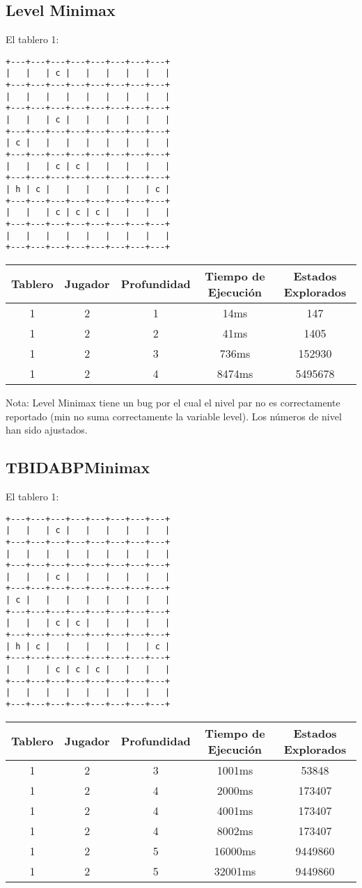 \documentclass[10pt,a4paper,notitlepage]{article}
\begin{document}
\newpage
\subsection{Level Minimax}

El tablero 1:
\begin{verbatim}
+---+---+---+---+---+---+---+---+
|   |   | c |   |   |   |   |   |
+---+---+---+---+---+---+---+---+
|   |   |   |   |   |   |   |   |
+---+---+---+---+---+---+---+---+
|   |   | c |   |   |   |   |   |
+---+---+---+---+---+---+---+---+
| c |   |   |   |   |   |   |   |
+---+---+---+---+---+---+---+---+
|   |   | c | c |   |   |   |   |
+---+---+---+---+---+---+---+---+
| h | c |   |   |   |   |   | c |
+---+---+---+---+---+---+---+---+
|   |   | c | c | c |   |   |   |
+---+---+---+---+---+---+---+---+
|   |   |   |   |   |   |   |   |
+---+---+---+---+---+---+---+---+
\end{verbatim}
\begin{tabular}{|c|c|c|c|c|}
\hline
Tablero & Jugador & Profundidad & Tiempo de Ejecución & Estados Explorados \\
\hline
\hline
1&2&1&14ms&147\\
\hline
1&2&2&41ms&1405\\
\hline
1&2&3&736ms&152930\\
\hline
1&2&4&8474ms&5495678\\
\hline
\end{tabular}

Nota: Level Minimax tiene un bug por el cual el nivel par no es correctamente reportado (min no suma correctamente la variable level). Los números de nivel han sido ajustados.

\newpage
\subsection{TBIDABPMinimax}
El tablero 1:
\begin{verbatim}
+---+---+---+---+---+---+---+---+
|   |   | c |   |   |   |   |   |
+---+---+---+---+---+---+---+---+
|   |   |   |   |   |   |   |   |
+---+---+---+---+---+---+---+---+
|   |   | c |   |   |   |   |   |
+---+---+---+---+---+---+---+---+
| c |   |   |   |   |   |   |   |
+---+---+---+---+---+---+---+---+
|   |   | c | c |   |   |   |   |
+---+---+---+---+---+---+---+---+
| h | c |   |   |   |   |   | c |
+---+---+---+---+---+---+---+---+
|   |   | c | c | c |   |   |   |
+---+---+---+---+---+---+---+---+
|   |   |   |   |   |   |   |   |
+---+---+---+---+---+---+---+---+
\end{verbatim}
\begin{tabular}{|c|c|c|c|c|}
\hline
Tablero & Jugador & Profundidad & Tiempo de Ejecución & Estados Explorados \\
\hline
\hline
1&2&3&1001ms&53848\\
\hline
1&2&4&2000ms&173407\\
\hline
1&2&4&4001ms&173407\\
\hline
1&2&4&8002ms&173407\\
\hline
1&2&5&16000ms&9449860\\
\hline
1&2&5&32001ms&9449860\\
\hline
\end{tabular}
\end{document}
